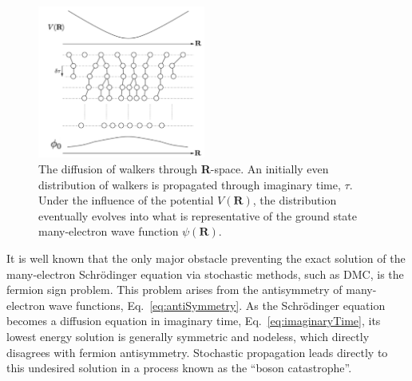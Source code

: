 \begin{figure}[h!]
\begin{center}
\includegraphics[width =0.49\textwidth]{DMC.pdf}
\caption[Illustration of the diffusion of walkers in DMC]{The diffusion of walkers through \textbf{R}-space. An initially even distribution of walkers is propagated through imaginary time, $\tau$. Under the influence of the potential $V(\textbf{R})$,  the distribution eventually evolves into what is representative of the ground state many-electron wave function $\psi(\textbf{R})$.}
\label{fig:DMC}
\end{center}
\end{figure}

It is well known that the only major obstacle preventing the exact solution of the many-electron  Schr\"{o}dinger equation via stochastic methods, such as DMC, is the fermion sign problem. This problem arises from the antisymmetry of many-electron wave functions, Eq.~\ref{eq:antiSymmetry}. As the  Schr\"{o}dinger equation becomes a diffusion equation in imaginary time, Eq.~\ref{eq:imaginaryTime}, its lowest energy solution is generally symmetric and nodeless, which directly disagrees with fermion antisymmetry. Stochastic propagation leads directly to this undesired solution in a process known as the ``boson catastrophe''\cite{Booth2009}.

